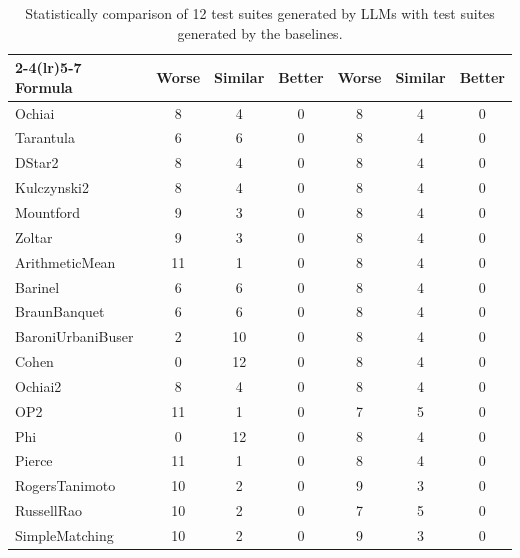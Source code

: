 \begin{table}[t]
\centering
\caption{Statistically comparison of 12 test suites generated by LLMs with test suites generated by the baselines.}
\label{tab:rq3bw-pairwise-counts}
\begin{tabular}{lcccccc}
\toprule
\cmidrule(lr){2-4}\cmidrule(lr){5-7}
\textbf{Formula} & Worse & Similar & Better & Worse & Similar & Better \\
\midrule
Ochiai & 8 & 4 & 0 & 8 & 4 & 0 \\
Tarantula & 6 & 6 & 0 & 8 & 4 & 0 \\
DStar2 & 8 & 4 & 0 & 8 & 4 & 0 \\
Kulczynski2 & 8 & 4 & 0 & 8 & 4 & 0 \\
Mountford & 9 & 3 & 0 & 8 & 4 & 0 \\
Zoltar & 9 & 3 & 0 & 8 & 4 & 0 \\
ArithmeticMean & 11 & 1 & 0 & 8 & 4 & 0 \\
Barinel & 6 & 6 & 0 & 8 & 4 & 0 \\
BraunBanquet & 6 & 6 & 0 & 8 & 4 & 0 \\
BaroniUrbaniBuser & 2 & 10 & 0 & 8 & 4 & 0 \\
Cohen & 0 & 12 & 0 & 8 & 4 & 0 \\
Ochiai2 & 8 & 4 & 0 & 8 & 4 & 0 \\
OP2 & 11 & 1 & 0 & 7 & 5 & 0 \\
Phi & 0 & 12 & 0 & 8 & 4 & 0 \\
Pierce & 11 & 1 & 0 & 8 & 4 & 0 \\
RogersTanimoto & 10 & 2 & 0 & 9 & 3 & 0 \\
RussellRao & 10 & 2 & 0 & 7 & 5 & 0 \\
SimpleMatching & 10 & 2 & 0 & 9 & 3 & 0 \\
\bottomrule
\end{tabular}
\end{table}

